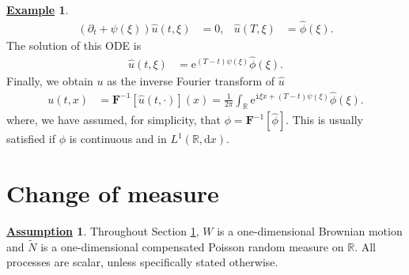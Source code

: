 \documentclass[12pt]{book}
\let\varphi\phi
\numberwithin{equation}{chapter}
\theoremstyle{plain}
\numberwithin{theorem}{section}
\theoremstyle{definition}
\newtheorem{example}[theorem]{\underline{Example}}
\newtheorem{assumption}[theorem]{\underline{Assumption}}
\numberwithin{exercise}{chapter}
\newcommand{\<}{\langle}
\renewcommand{\>}{\rangle}
\renewcommand{\(}{\left(}
\renewcommand{\)}{\right)}
\renewcommand{\[}{\left[}
\renewcommand{\]}{\right]}
\newcommand\Rb{\mathds{R}}
\newcommand\Fv{\pmb{F}}
\newcommand\varphih{\widehat{\varphi}}
\newcommand\uh{\widehat{u}}
\newcommand\Nt{\widetilde{N}}
\renewcommand\d{\partial}
\newcommand\ii{\mathtt{i}}
\newcommand\dd{\mathrm{d}}
\newcommand\ee{\mathrm{e}}
\begin{document}
\begin{example}
\begin{align}
(\d_t + \psi(\xi)) \uh(t,\xi)
	&=	0 , &
\uh(T,\xi)
	&=	\varphih(\xi) .
\end{align} 
The solution of this ODE is
\begin{align}
\uh(t,\xi)
	&=	\ee^{(T-t)\psi(\xi)} \varphih(\xi) .
\end{align}
Finally, we obtain $u$ as the inverse Fourier transform of $\uh$
\begin{align}
u(t,x)
	&=	\Fv^{-1}[ \uh(t,\cdot) ](x)
	=		\frac{1}{2 \pi} \int_\Rb \ee^{\ii \xi x + (T-t)\psi(\xi)} \varphih(\xi) .
\end{align}
where, we have assumed, for simplicity, that $\varphi = \Fv^{-1}[\varphih]$.  This is usually satisfied if $\varphi$ is continuous and in $L^1(\Rb,\dd x)$.
\end{example}

\section{Change of measure}
\label{sec:change.of.measure}


\begin{assumption}
Throughout Section \ref{sec:change.of.measure}, $W$ is a one-dimensional Brownian motion and $\Nt$ is a one-dimensional compensated Poisson random measure on $\Rb$.  All processes are scalar, unless specifically stated otherwise.
\end{assumption}
\end{document}
